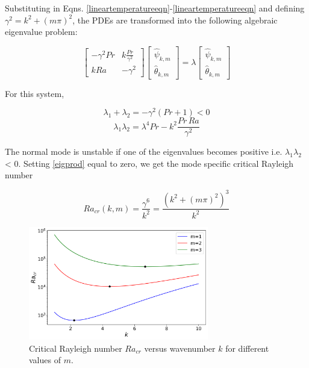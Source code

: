 \documentclass[paper=a4, fontsize=11pt]{scrartcl}
\numberwithin{equation}{section}		%
\numberwithin{figure}{section}			%
\numberwithin{table}{section}				%
\begin{document}
Substituting in Eqns. \ref{lineartemperatureeqn}-\ref{lineartemperatureeqn} and defining $\gamma^2 = k^2 + (m\pi)^2$, the PDEs are transformed into the following algebraic eigenvalue problem:

\begin{equation}
	\begin{bmatrix}
		-\gamma^2 Pr & k \frac{Pr}{\gamma^2}  \\
		 k Ra & - \gamma^2 
	\end{bmatrix}
	\begin{bmatrix}
		\hat{\psi}_{k,m} \\
		\hat{\theta}_{k,m}
	\end{bmatrix}
	=
	\lambda 
	\begin{bmatrix}
		\hat{\psi}_{k,m} \\
		\hat{\theta}_{k,m}
	\end{bmatrix}
\end{equation}

\noindent For this system,

\begin{equation}
	\lambda_1 + \lambda_2 = - \gamma^2 (Pr + 1) < 0 
\end{equation}
\begin{equation}
	\lambda_1 \lambda_2 = \lambda^4 Pr - k^2 \frac{Pr \, Ra}{\gamma^2} 
	\label{eigprod}
\end{equation}

The normal mode is unstable if one of the eigenvalues becomes positive i.e. $\lambda_1 \lambda_2$ < 0. Setting \ref{eigprod} equal to zero, we get the mode specific critical Rayleigh number 

\begin{equation}
	Ra_{cr}(k, m) = \frac{\gamma^6}{k^2} = \frac{(k^2 + (m\pi)^2)^3}{k^2}
\end{equation}

\begin{figure}[h]
	\centering
	\includegraphics[width=0.7\textwidth]{media/Ra_cr.png}
	\caption{Critical Rayleigh number $Ra_{cr}$ versus wavenumber $k$ for different values of $m$.}
	\label{fig:Ra_cr}
\end{figure}
\end{document}
